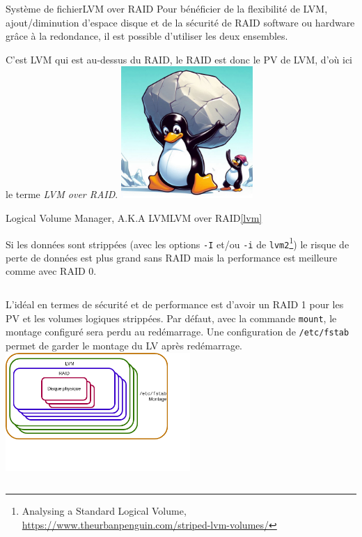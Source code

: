 \documentclass{beamer}
\begin{document}
    \begin{frame}{Système de fichier}{LVM over RAID}
        Pour bénéficier de la flexibilité de LVM, ajout/diminution d'espace disque et de la sécurité de RAID software ou hardware grâce à la redondance, il est possible d'utiliser les deux ensembles.

        C'est LVM qui est au-dessus du RAID, le RAID est donc le PV de LVM, d'où ici le terme \textit{LVM over RAID}.
        \bigbreak
        \centering
        \includegraphics[width=5cm]{image/tux-supports-stone}
    \end{frame}

    \begin{frame}{Logical Volume Manager, A.K.A LVM}{LVM over RAID\cref{lvm}}
        \begin{small}
            Si les données sont strippées (avec les options \lstinline{-I} et/ou \lstinline{-i} de \lstinline{lvm2}\footnote{Analysing a Standard Logical Volume, \url{https://www.theurbanpenguin.com/striped-lvm-volumes/}}) le risque de perte de données est plus grand sans RAID mais la performance est meilleure comme avec RAID 0.
            \bigbreak
            \begin{columns}
                L'idéal en termes de sécurité et de performance est d'avoir un RAID 1 pour les PV et les volumes logiques strippées.
                \bigbreak
                Par défaut, avec la commande \lstinline{mount}, le montage configuré sera perdu au redémarrage.
                Une configuration de \lstinline{/etc/fstab} permet de garder le montage du LV après redémarrage.
                \bigbreak
                \centering
                \includegraphics[width=7cm]{image/fs-stack.drawio}
            \end{columns}
        \end{small}
    \end{frame}
\end{document}
